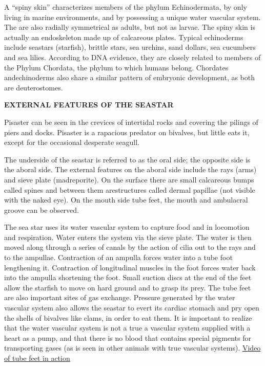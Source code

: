 \documentclass[
]{book}
\begin{document}
A ``spiny skin'' characterizes members of the phylum Echinodermata, by only living in marine environments, and by possessing a unique water vascular system. The are also radially symmetrical as adults, but not as larvae. The spiny skin is actually an endoskeleton made up of calcareous plates. Typical echinoderms include seastars (starfish), brittle stars, sea urchins, sand dollars, sea cucumbers and sea lilies. According to DNA evidence, they are closely related to members of the Phylum Chordata, the phylum to which humans belong. Chordates andechinoderms also share a similar pattern of embryonic development, as both are deuterostomes.

\textbf{EXTERNAL FEATURES OF THE SEASTAR}

Pisaster can be seen in the crevices of intertidal rocks and covering the pilings of piers and docks. Pisaster is a rapacious predator on bivalves, but little eats it, except for the occasional desperate seagull.

The underside of the seastar is referred to as the oral side; the opposite side is the aboral side. The external features on the aboral side include the rays (arms) and sieve plate (madreporite). On the surface there are small calcareous bumps called spines and between them arestructures called dermal papillae (not visible with the naked eye). On the mouth side tube feet, the mouth and ambulacral groove can be observed.

The sea star uses its water vascular system to capture food and in locomotion and respiration. Water enters the system via the sieve plate. The water is then moved along through a series of canals by the action of cilia out to the rays and to the ampullae. Contraction of an ampulla forces water into a tube foot lengthening it. Contraction of longitudinal muscles in the foot forces water back into the ampulla shortening the foot. Small suction discs at the end of the feet allow the starfish to move on hard ground and to grasp its prey. The tube feet are also important sites of gas exchange. Pressure generated by the water vascular system also allows the seastar to evert its cardiac stomach and pry open the shells of bivalves like clams, in order to eat them. It is important to realize that the water vascular system is not a true a vascular system supplied with a heart as a pump, and that there is no blood that contains special pigments for transporting gases (as is seen in other animals with true vascular systems). \href{http://www.youtube.com/watch?v=p0VM67cQUWw\&feature=related}{Video of tube feet in action}
\end{document}
